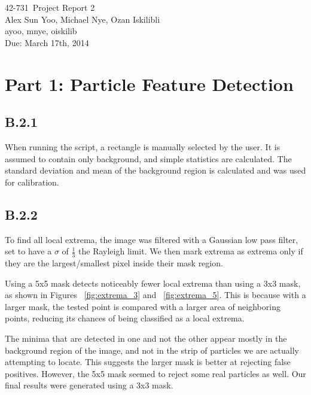 \documentclass{article}
\newcommand{\hmwkTitle}{Project Report 2}
\newcommand{\hmwkDueDate}{March 17th, 2014}
\newcommand{\hmwkClass}{42-731}
\newcommand{\hmwkAuthor}{Alex Sun Yoo, Michael Nye, Ozan Iskilibli}
\newcommand{\hmwkEmail}{ayoo, mnye, oiskilib}
\newcommand{\hmwkCollaborators}{}
\begin{document}
\thispagestyle{plain}
\begin{center}
{\Large \hmwkClass\ \hmwkTitle} \\
\hmwkAuthor \\
\hmwkEmail \\
\ifthenelse{\equal{\hmwkCollaborators}{}}{}{Collaborators: \hmwkCollaborators\\}
Due: \hmwkDueDate\\
\end{center}

\section*{Part 1: Particle Feature Detection}

\subsection*{B.2.1}

When running the script, a rectangle is manually selected by the user. It is assumed to contain only background, and simple statistics are calculated.
The standard deviation and mean of the background region is calculated and was used for calibration.

\subsection*{B.2.2}

To find all local extrema, the image was filtered with a Gaussian low pass filter, set to have a $\sigma$ of $\frac{1}{3}$ the Rayleigh limit. We then mark extrema as extrema only if they are the largest/smallest pixel inside their mask region.

Using a 5x5 mask detects noticeably fewer local extrema than using a 3x3 mask, as shown in Figures ~\ref{fig:extrema_3} and ~\ref{fig:extrema_5}. This is because with a larger mask, the tested point is compared with a larger area of neighboring points, reducing its chances of being classified as a local extrema.

The minima that are detected in one and not the other appear mostly in the background region of the image, and not in the strip of particles we are actually attempting to locate. This suggests the larger mask is better at rejecting false positives. However, the 5x5 mask seemed to reject some real particles as well. Our final results were generated using a 3x3 mask.
\end{document}
